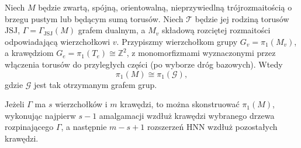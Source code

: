 \begin{twierdzenie}
\label{thm:tg-jsj-graph-of-groups}
Niech $M$ będzie zwartą, spójną, orientowalną,
nieprzywiedlną trójrozmaitością o brzegu pustym
lub będącym sumą torusów. Niech $\mathcal T$
będzie jej rodziną torusów JSJ,
$\Gamma=\Gamma_{\mathrm{JSJ}}(M)$ grafem
dualnym, a $M_v$ składową rozciętej
rozmaitości odpowiadającą wierzchołkowi $v$.
Przypiszmy wierzchołkom grupy
$G_v=\pi_1(M_v)$, a krawędziom
$G_e=\pi_1(T_e)\cong\mathbb Z^2$,
z monomorfizmami wyznaczonymi przez
włączenia torusów do przyległych części
(po wyborze dróg bazowych).
Wtedy
\[
\pi_1(M)\cong\pi_1(\mathcal G),
\]
gdzie $\mathcal G$ jest tak otrzymanym grafem grup.

Jeżeli $\Gamma$ ma $s$ wierzchołków i $m$
krawędzi, to można skonstruować
$\pi_1(M)$, wykonując najpierw
$s-1$ amalgamacji wzdłuż krawędzi
wybranego drzewa rozpinającego $\Gamma$,
a następnie $m-s+1$ rozszerzeń HNN
wzdłuż pozostałych krawędzi.
\end{twierdzenie}

